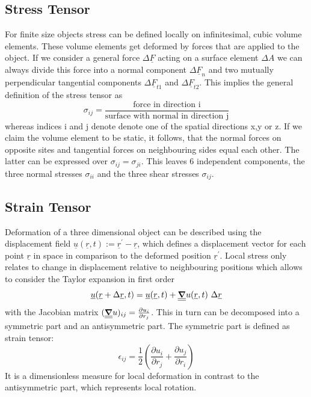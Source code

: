 \subsection{Stress Tensor}
For finite size objects stress can be defined locally on
infinitesimal, cubic volume elements. These volume elements get deformed by
forces that are applied to the object. If we consider a general force
$\Delta \underline{F}$ acting on a surface element $\Delta A$ we can always
divide
this force into a normal component $\Delta \underline{F}_n$ and two mutually
perpendicular tangential components $\Delta \underline{F}_{t1}$ and
$\Delta \underline{F}_{t2}$. This implies the general definition of the stress
tensor
as
\begin{equation}
    \sigma_{ij} = \frac{\text{force in direction i}}{\text{surface with normal
            in direction j}}
\end{equation}
whereas indices i and j denote denote one of the spatial directions x,y or z.
If we claim the volume element to be static, it follows, that the normal forces
on opposite sites and tangential forces on neighbouring sides equal each other.
The latter can be expressed over $\sigma_{ij}=\sigma_{ji}$. This leaves 6
independent components, the three normal stresses $\sigma_{ii}$ and the three
shear stresses $\sigma_{ij}$.

\subsection{Strain Tensor}
Deformation of a three dimensional object can be described using the
displacement field $\underline{u}(\underline{r}, t):=
    \underline{r}^\prime-\underline{r}$,
which defines a displacement vector for each point $\underline{r}$ in space in
comparison to the deformed position $\underline{r}^\prime$. Local stress only
relates to change in displacement relative to neighbouring positions which
allows to consider the Taylor expansion in first order
\begin{equation}
    \underline{u}(\underline{r}+\Delta\underline{r}, t)
    = \underline{u}(\underline{r}, t) +
    \underline{\underline{\gradient}}u(\underline{r}, t)\ \Delta \underline{r}
\end{equation}
with the Jacobian matrix $(\underline{\underline{\gradient}}u )_{ij} =
    \frac{\partial u_i}{\partial r_j}$. This in turn can be decomposed into a
symmetric part and an antisymmetric part. The symmetric part is defined as
strain tensor:
\begin{equation}
    \epsilon_{ij} = \frac{1}{2} \left(	 \frac{\partial u_i}{\partial r_j}
    +\frac{\partial u_j}{\partial r_i} \right)
\end{equation}
It is a dimensionless measure for local deformation in contrast to the
antisymmetric part, which represents local rotation.


